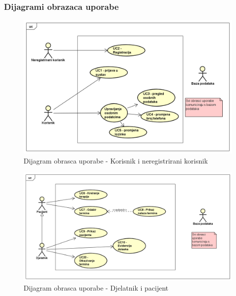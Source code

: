 				\subsubsection{Dijagrami obrazaca uporabe}
					
					\begin{figure}[H]
						\includegraphics[scale=0.6]{slike/dijagram_obrasca_uporabe1.PNG} %
						\centering
						\caption{Dijagram obrasca uporabe - Korisnik i neregistrirani korisnik}
						\label{fig:dijagram_UC1}
					\end{figure}
					
					\begin{figure}[H]
						\includegraphics[scale=0.45]{slike/dijagram_obrasca_uporabe2.PNG} %
						\centering
						\caption{Dijagram obrasca uporabe - Djelatnik i pacijent}
						\label{fig:dijagram_UC2}
					\end{figure}
					
